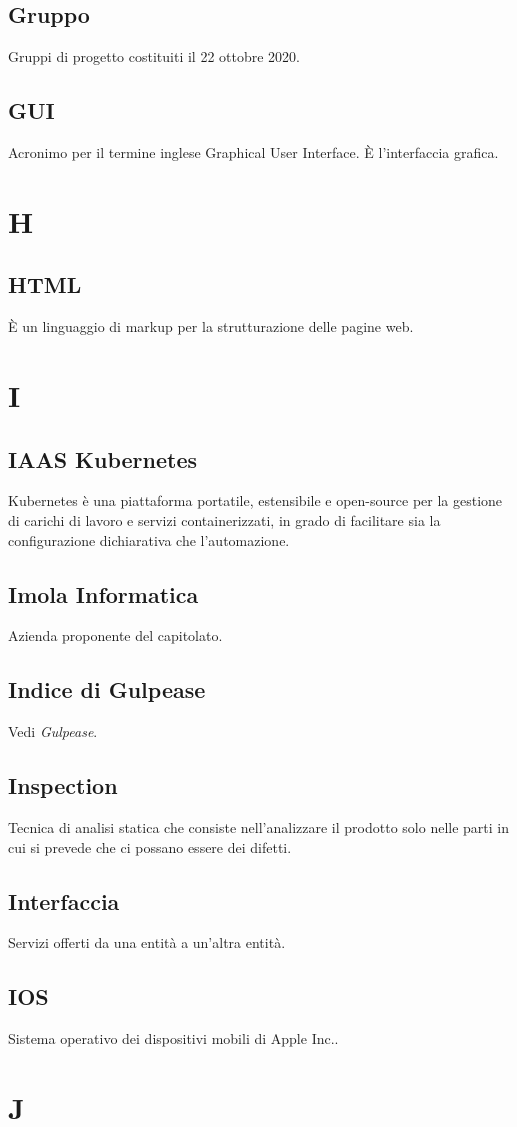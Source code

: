 \subsection{Gruppo} Gruppi di progetto costituiti il 22 ottobre 2020.
\subsection{GUI} Acronimo per il termine inglese Graphical User Interface. È l'interfaccia grafica.
\newpage \section{H}
\subsection{HTML} È un linguaggio di markup per la strutturazione delle pagine web.
\newpage \section{I}
\subsection{IAAS Kubernetes} Kubernetes è una piattaforma portatile, estensibile e open-source per la gestione di carichi di lavoro e servizi containerizzati, in grado di facilitare sia la configurazione dichiarativa che l'automazione.
\subsection{Imola Informatica} Azienda proponente del capitolato.
\subsection{Indice di Gulpease} Vedi \textit{Gulpease}.
\subsection{Inspection} Tecnica di analisi statica che consiste nell’analizzare il prodotto solo nelle parti in cui si prevede che ci possano essere dei difetti.
\subsection{Interfaccia} Servizi offerti da una entità a un'altra entità.
\subsection{IOS} Sistema operativo dei dispositivi mobili di Apple Inc..
\newpage \section{J}
